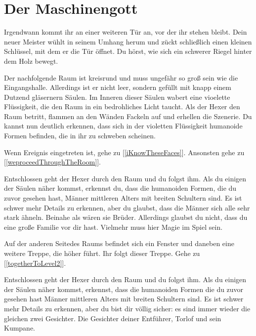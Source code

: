 \chapter*{Der Maschinengott}



Irgendwann kommt ihr an einer weiteren Tür an, vor der ihr stehen bleibt. Dein neuer Meister wühlt in seinem Umhang herum und zückt schließlich einen kleinen Schlüssel, mit dem er die Tür öffnet. Du hörst, wie sich ein schwerer Riegel hinter dem Holz bewegt.

Der nachfolgende Raum ist kreisrund und muss ungefähr so groß sein wie die Eingangshalle. Allerdings ist er nicht leer, sondern gefüllt mit knapp einem Dutzend gläsernern Säulen. Im Inneren dieser Säulen wabert eine vioelette Flüssigkeit, die den Raum in ein bedrohliches Licht taucht. Als der Hexer den Raum betritt, flammen an den Wänden Fackeln auf und erhellen die Szenerie. Du kannst nun deutlich erkennen, dass sich in der violetten Flüssigkeit humanoide Formen befinden, die in ihr zu schweben scheinen.

Wenn Ereignis  eingetreten ist, gehe zu [\ref{iKnowTheseFaces}]. Ansonsten gehe zu [\ref{weproceedThroughTheRoom}].


Entschlossen geht der Hexer durch den Raum und du folgst ihm. Als du einigen der Säulen näher kommst, erkennst du, dass die humanoiden Formen, die du zuvor gesehen hast, Männer mittleren Alters mit breiten Schultern sind. Es ist schwer mehr Details zu erkennen, aber du glaubst, dass die Männer sich alle sehr stark ähneln. Beinahe als wären sie Brüder. Allerdings glaubst du nicht, dass du eine große Familie vor dir hast. Vielmehr muss hier Magie im Spiel sein.

Auf der anderen Seitedes Raums befindet sich ein Fenster und daneben eine weitere Treppe, die höher führt. Ihr folgt dieser Treppe.
Gehe zu [\ref{togetherToLevel2}].


Entschlossen geht der Hexer durch den Raum und du folgst ihm. Als du einigen der Säulen näher kommst, erkennst, dass die humanoiden Formen die du zuvor gesehen hast Männer mittleren Alters mit breiten Schultern sind. Es ist schwer mehr Details zu erkennen, aber du bist dir völlig sicher: es sind immer wieder die gleichen zwei Gesichter. Die Gesichter deiner Entführer, Torlof und sein Kumpane.

